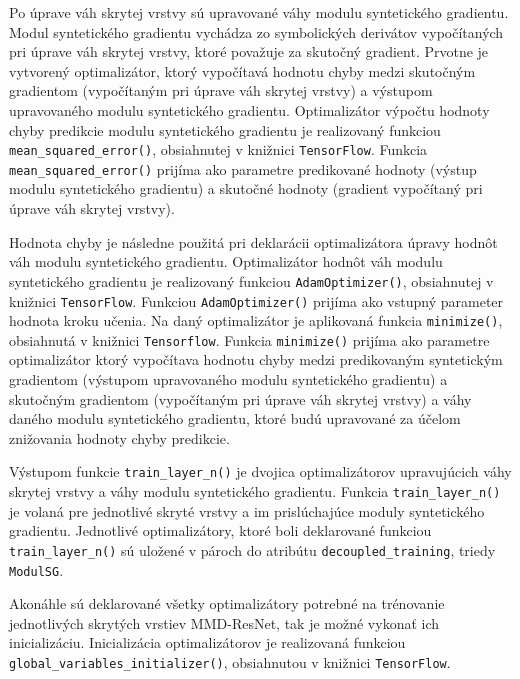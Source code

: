 Po úprave váh skrytej vrstvy sú upravované váhy modulu syntetického gradientu. Modul syntetického gradientu vychádza zo symbolických derivátov vypočítaných pri úprave váh skrytej vrstvy, ktoré považuje za skutočný gradient. Prvotne je vytvorený optimalizátor, ktorý vypočítavá hodnotu chyby medzi skutočným gradientom (vypočítaným pri úprave váh skrytej vrstvy) a výstupom upravovaného modulu syntetického gradientu. Optimalizátor výpočtu hodnoty chyby predikcie modulu syntetického gradientu je realizovaný funkciou \texttt{mean_squared_error()}, obsiahnutej v knižnici \texttt{TensorFlow}. Funkcia \texttt{mean_squared_error()} prijíma ako parametre predikované hodnoty (výstup modulu syntetického gradientu) a skutočné hodnoty (gradient vypočítaný pri úprave váh skrytej vrstvy).

Hodnota chyby je následne použitá pri deklarácii optimalizátora úpravy hodnôt váh modulu syntetického gradientu. Optimalizátor hodnôt váh modulu syntetického gradientu je realizovaný funkciou \texttt{AdamOptimizer()}, obsiahnutej v knižnici \texttt{TensorFlow}. Funkciou \texttt{AdamOptimizer()} prijíma ako vstupný parameter hodnota kroku učenia. Na daný optimalizátor je aplikovaná funkcia \texttt{minimize()}, obsiahnutá v knižnici \texttt{Tensorflow}. Funkcia \texttt{minimize()} prijíma ako parametre optimalizátor ktorý vypočítava hodnotu chyby medzi predikovaným syntetickým gradientom (výstupom upravovaného modulu syntetického gradientu) a skutočným gradientom (vypočítaným pri úprave váh skrytej vrstvy) a váhy daného modulu syntetického gradientu, ktoré budú upravované za účelom znižovania hodnoty chyby predikcie.

Výstupom funkcie \texttt{train_layer_n()} je dvojica optimalizátorov upravujúcich váhy skrytej vrstvy a váhy modulu syntetického gradientu. Funkcia \texttt{train_layer_n()} je volaná pre jednotlivé skryté vrstvy a im prislúchajúce moduly syntetického gradientu. Jednotlivé optimalizátory, ktoré boli deklarované funkciou \texttt{train_layer_n()} sú uložené v pároch do atribútu \texttt{decoupled_training}, triedy \texttt{ModulSG}. 

Akonáhle sú deklarované všetky optimalizátory potrebné na trénovanie jednotlivých skrytých vrstiev MMD-ResNet, tak je možné vykonať ich inicializáciu. Inicializácia optimalizátorov je realizovaná funkciou \texttt{global_variables_initializer()}, obsiahnutou v knižnici \texttt{TensorFlow}.

